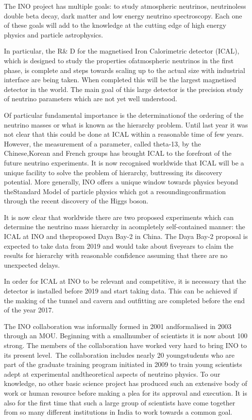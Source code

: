 The INO project has multiple goals: to study atmospheric neutrinos,
neutrinoless double beta decay, dark matter and low energy neutrino
spectroscopy. Each one of these goals will add to the knowledge at the
cutting edge of high energy physics and particle astrophysics.

In particular, the R\& D for the magnetised Iron Calori\-metric detector
(ICAL), which is designed to study the properties of\break atmospheric neutrinos
in the first phase, is complete and steps towards scaling up to the
actual size with industrial interface are being taken. When completed
this will be the largest magnetised detector in the world. The main goal
of this large detector is the precision study of neutrino parameters
which are not yet well understood.

Of particular fundamental importance is the determination\break of the ordering
of the neutrino masses or what is known as the hierar\-chy problem. Until
last year it was not clear that this could be done at ICAL within a
reasonable time of few years. However, the measurement of a parameter,
called theta-13, by the Chinese,\break Korean and French groups has brought ICAL
to the forefront of the future neutrino experiments. It is now recognised
worldwide that ICAL will be a unique facility to solve the problem of\break
hierarchy, buttressing its discovery potential. More generally, INO offers
a unique window towards physics beyond the\break Standard Model of particle
physics which got a resounding\break confirmation through the recent discovery
of the Higgs boson.

It is now clear that worldwide there are two proposed experi\-ments which
can determine the neutrino mass hierarchy in a\break completely self-contained
manner: the ICAL at INO and the\break proposed Daya Bay-2 in China. The Daya
Bay-2 proposal is expecte\-d to take data from 2019 and would take about
five\break years to claim the results for hierarchy with reasonable confidence
assuming that there are no unexpected delays.

In order for ICAL at INO to be relevant and competitive, it is necessary
that the detector is installed before 2019 and start taking data. This
can be achieved if the making of the tunnel and cavern and outfitting
are completed before the end of the year 2017.

The INO collaboration was informally formed in 2001 and\break formalised in 2003
through an MOU. Beginning with a small\break number of scientists it is now
about 100 strong. The members of the collaboration have worked very hard
to bring INO to its present level.\ The collaboration includes nearly 20
young\break students who are part of the graduate training program initiated in
2009 to train young scientists adept at experimental and\break theoretical
aspects of neutrino physics. To our knowledge, no other basic science
project has produced such an extensive body of work or human resource
before making a plea for its approval and executio\-n. It is also
for the first time that such a large group of scientists have come
together from so many different institutions in India to work towards
a common goal.


